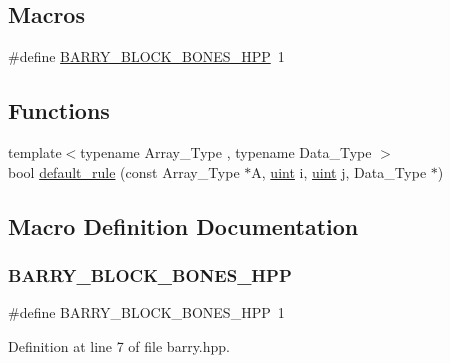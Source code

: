 \subsection*{Macros}
\begin{DoxyCompactItemize}
\item 
\#define \hyperlink{barry_8hpp_ae8f9d4181425b0f42e8ff4de2449b553}{B\+A\+R\+R\+Y\+\_\+\+B\+L\+O\+C\+K\+\_\+\+B\+O\+N\+E\+S\+\_\+\+H\+PP}~1
\end{DoxyCompactItemize}
\subsection*{Functions}
\begin{DoxyCompactItemize}
\item 
{\footnotesize template$<$typename Array\+\_\+\+Type , typename Data\+\_\+\+Type $>$ }\\bool \hyperlink{block-bones_8hpp_a4aff3c5c755b16bc4634ab8d8e7fb3f6}{default\+\_\+rule} (const Array\+\_\+\+Type $\ast$A, \hyperlink{typedefs_8hpp_a91ad9478d81a7aaf2593e8d9c3d06a14}{uint} i, \hyperlink{typedefs_8hpp_a91ad9478d81a7aaf2593e8d9c3d06a14}{uint} j, Data\+\_\+\+Type $\ast$)
\end{DoxyCompactItemize}


\subsection{Macro Definition Documentation}
\mbox{\label{barry_8hpp_ae8f9d4181425b0f42e8ff4de2449b553}} 
\subsubsection{\texorpdfstring{B\+A\+R\+R\+Y\+\_\+\+B\+L\+O\+C\+K\+\_\+\+B\+O\+N\+E\+S\+\_\+\+H\+PP}{BARRY\_BLOCK\_BONES\_HPP}}
{\footnotesize\ttfamily \#define B\+A\+R\+R\+Y\+\_\+\+B\+L\+O\+C\+K\+\_\+\+B\+O\+N\+E\+S\+\_\+\+H\+PP~1}



Definition at line 7 of file barry.\+hpp.



